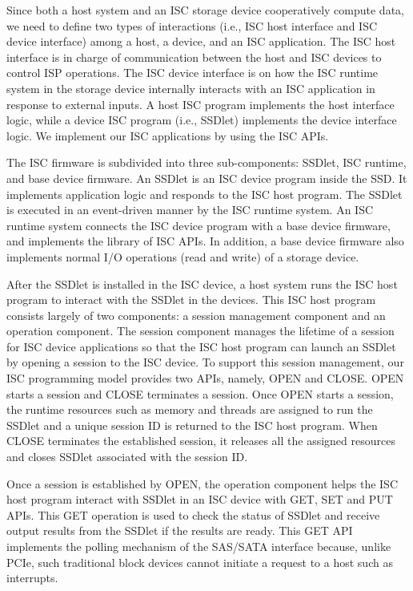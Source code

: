 Since both a host system and an ISC storage device cooperatively compute data, we need to define two types of interactions (i.e., ISC host interface and ISC device interface) among a host, a device, and an ISC application. The ISC host interface is in charge of communication between the host and ISC devices to control ISP operations. The ISC device interface is on how the ISC runtime system in the storage device internally interacts with an ISC application in response to external inputs. A host ISC program implements the host interface logic, while a device ISC program (i.e., SSDlet) implements the device interface logic. We implement our ISC applications by using the ISC APIs.

The ISC firmware is subdivided into three sub-components: SSDlet, ISC runtime, and base device firmware.
An SSDlet is an ISC device program inside the SSD. It implements application logic and responds to the ISC host program. The SSDlet is executed in an event-driven manner by the ISC runtime system. An ISC runtime system connects the ISC device program with a base device firmware, and implements the library of ISC APIs. In addition, a base device firmware also implements normal I/O operations (read and write) of a storage device.

After the SSDlet is installed in the ISC device, a host system runs the ISC host program to interact with the SSDlet in the devices. This ISC host program consists largely of two components: a session management component and an operation component. The session component manages the lifetime of a session for ISC device applications so that the ISC host program can launch an SSDlet by opening a session to the ISC device. To support this session management, our ISC programming model provides two APIs, namely, OPEN and CLOSE. OPEN starts a session and CLOSE terminates a session. Once OPEN starts a session, the runtime resources such as memory and threads are assigned to run the SSDlet and a unique session ID is returned to the ISC host program. %
When CLOSE terminates the established session, it releases all the assigned resources and closes SSDlet associated with the session ID.

Once a session is established by OPEN, the operation component helps the ISC host program interact with SSDlet in an ISC device with GET, SET and PUT APIs. This GET operation is used to check the status of SSDlet and receive output results from the SSDlet if the results are ready. This GET API implements the polling mechanism of the SAS/SATA interface because, unlike PCIe, such traditional block devices cannot initiate a request to a host such as interrupts. 

